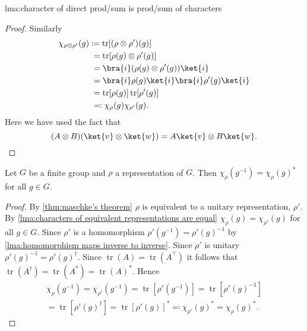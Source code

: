 \documentclass[fleqn]{NotesClass}
\newcommand*{\trans}{\top}
\newcommand*{\hermit}{\dagger}
\DeclareMathOperator{\tr}{tr}
\newcommand*{\directproduct}{\otimes}
\begin{document}
\begin{lma}{}{lma:character of direct prod/sum is prod/sum of characters}
\begin{proof}
            Similarly
            \begin{align}
                \chi_{\rho\directproduct\rho'}(g) &\coloneqq \tr[(\rho\directproduct\rho')(g)]\\
                &\hphantom{:}= \tr[\rho(g) \directproduct \rho'(g)]\\
                &\hphantom{:}= \bra{i}(\rho(g)\directproduct\rho'(g))\ket{i}\\
                &\hphantom{:}= \bra{i}\rho(g)\ket{i}\bra{i}\rho'(g)\ket{i}\\
                &\hphantom{:}= \tr[\rho(g)]\tr[\rho'(g)]\\
                &\hphantom{:}\eqqcolon \chi_\rho(g) \chi_{\rho'}(g).
            \end{align}
            Here we have used the fact that
            \begin{equation}
                (A\directproduct B) (\ket{v} \directproduct \ket{w}) = A\ket{v} \directproduct B\ket{w}.
            \end{equation}
        \end{proof}
    \end{lma}
    
    \begin{lma}{}{}
        Let \(G\) be a finite group and \(\rho\) a representation of \(G\).
        Then \(\chi_\rho(g^{-1}) = \chi_\rho(g)^*\) for all \(g \in G\).
        \begin{proof}
            By \cref{thm:maschke's theorem} \(\rho\) is equivalent to a unitary representation, \(\rho'\).
            By \cref{lma:characters of equivalent representations are equal} \(\chi_{\rho}(g) = \chi_{\rho'}(g)\) for all \(g \in G\).
            Since \(\rho'\) is a homomorphism \(\rho'(g^{-1}) = \rho'(g)^{-1}\) by \cref{lma:homomorphism maps inverse to inverse}.
            Since \(\rho'\) is unitary \(\rho'(g)^{-1} = \rho'(g)^{\hermit}\).
            Since \(\tr(A) = \tr(A^\trans)\) it follows that \(\tr(A^\hermit) = \tr(A^*) = \tr(A)^*\).
            Hence
            \begin{multline}
                \chi_{\rho}(g^{-1}) = \chi_{\rho'}(g^{-1}) = \tr[\rho'(g^{-1})] = \tr[\rho'(g)^{-1}]\\
                = \tr[\rho'(g)^{\hermit}] = \tr[\rho'(g)]^* \eqqcolon \chi_{\rho'}(g)^* = \chi_{\rho}(g)^*.
            \end{multline}
        \end{proof}
    \end{lma}
    
\end{document}
